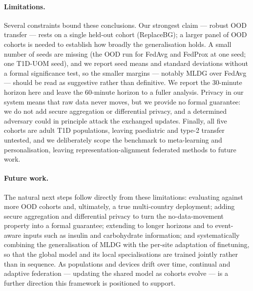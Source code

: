 \documentclass[10pt,letterpaper]{article}
\begin{document}
\paragraph{Limitations.} Several constraints bound these conclusions. Our
strongest claim --- robust OOD transfer --- rests on a single held-out cohort
(ReplaceBG); a larger panel of OOD cohorts is needed to establish how broadly the
generalisation holds. A small number of seeds are missing (the OOD run for FedAvg
and FedProx at one seed; one T1D-UOM seed), and we report seed means and standard
deviations without a formal significance test, so the smaller margins --- notably
MLDG over FedAvg --- should be read as suggestive rather than definitive. We
report the 30-minute horizon here and leave the 60-minute horizon to a fuller
analysis. Privacy in our system means that raw data never moves, but we provide no
formal guarantee: we do not add secure aggregation or differential privacy, and a
determined adversary could in principle attack the exchanged updates. Finally, all
five cohorts are adult T1D populations, leaving paediatric and type-2 transfer
untested, and we deliberately scope the benchmark to meta-learning and
personalisation, leaving representation-alignment federated methods to future
work.

\paragraph{Future work.} The natural next steps follow directly from these
limitations: evaluating against more OOD cohorts and, ultimately, a true
multi-country deployment; adding secure aggregation and differential privacy to
turn the no-data-movement property into a formal guarantee; extending to longer
horizons and to event-aware inputs such as insulin and carbohydrate information;
and systematically combining the generalisation of MLDG with the per-site
adaptation of finetuning, so that the global model and its local specialisations
are trained jointly rather than in sequence. As populations and devices drift over
time, continual and adaptive federation --- updating the shared model as cohorts
evolve --- is a further direction this framework is positioned to support.



\end{document}
